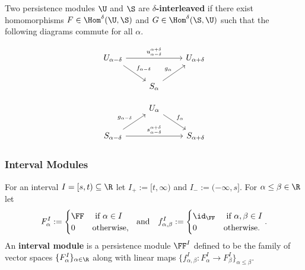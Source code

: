\begin{definition}[Interleaving]
  Two persistence modules $\U$ and $\S$ are \textbf{$\delta$-interleaved} if there exist homomorphisms $F\in\Hom^\delta(\U, \S)$ and $G \in\Hom^\delta(\S,\U)$ such that the following diagrams commute for all $\alpha$.

  \begin{minipage}{0.45\textwidth}
  \begin{equation}\label{dgm:interleaving1}
    \begin{tikzcd}
      U_{\alpha-\delta}\arrow{rr}{u_{\alpha-\delta}^{\alpha+\delta}}\arrow{dr}{f_{\alpha-\delta}} & &
      U_{\alpha+\delta}\\
      & S_{\alpha}\arrow{ur}{g_\alpha} &
  \end{tikzcd}\end{equation}
  \end{minipage}
  \begin{minipage}{0.45\textwidth}
  \begin{equation}\label{dgm:interleaving2}
    \begin{tikzcd}
      & U_{\alpha}\arrow{dr}{f_\alpha} &\\
      S_{\alpha-\delta}\arrow{rr}{s_{\alpha-\delta}^{\alpha+\delta}}\arrow{ur}{g_{\alpha-\delta}} & &
      S_{\alpha+\delta}
  \end{tikzcd}\end{equation}
  \end{minipage}
\end{definition}

\subsubsection{Interval Modules}

For an interval $I = [s,t)\subseteq \R$ let $I_+ := [t,\infty)$ and $I_- := (-\infty, s]$.
For $\alpha\leq\beta\in\R$ let
\[ F_\alpha^I := \begin{cases} \FF&\text{ if } \alpha\in I\\ 0 &\text{otherwise,}\end{cases}\ \text{ and }\ \ f_{\alpha,\beta}^I := \begin{cases} \id_\FF&\text{ if } \alpha,\beta\in I\\ 0&\text{otherwise.}\end{cases}.\]
An \textbf{interval module} is a persistence module $\FF^I$ defined to be the family of vector spaces $\{F_\alpha^I\}_{\alpha\in\R}$ along with linear maps $\{f_{\alpha,\beta}^I : F_\alpha^I\to F_\beta^I\}_{\alpha\leq\beta}$.

